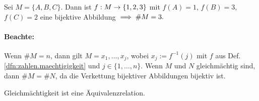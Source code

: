 \documentclass[12pt]{scrreprt}
\begin{document}
\begin{bsp*}
Sei $M = \{A, B, C\}$. Dann ist $f:M \rightarrow \{1,2,3\}$ mit 
$f(A) = 1$, $f(B)=3$, $f(C)=2$ eine bijektive Abbildung $\implies \#M = 3.$
\end{bsp*}
\paragraph{Beachte:} Wenn $\#M=n$, dann gilt $M = {x_1, \dotsc , x_j}$, wobei $x_j := f^{-1}(j)$ mit $f$
aus Def. \ref{dfn:zahlen.maechtigigkeit} und $j \in \{1, \dotsc, n\}$. Wenn $M$ und $N$ gleichmächtig sind,
dann $\#M=\#N$, da die Verkettung bijektiver Abbildungen bijektiv ist.
\begin{bem*}Gleichmächtigkeit ist eine Äquivalenzrelation.\end{bem*}
\end{document}
